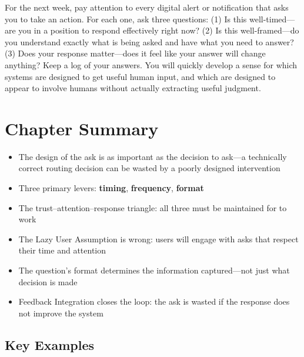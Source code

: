 \begin{trythis}
For the next week, pay attention to every digital alert or notification that asks you to take an action. For each one, ask three questions: (1) Is this well-timed---are you in a position to respond effectively right now? (2) Is this well-framed---do you understand exactly what is being asked and have what you need to answer? (3) Does your response matter---does it feel like your answer will change anything? Keep a log of your answers. You will quickly develop a sense for which systems are designed to get useful human input, and which are designed to appear to involve humans without actually extracting useful judgment.
\end{trythis}

\section*{Chapter Summary}

\begin{keyconcept}
\begin{itemize}
  \item The design of the ask is as important as the decision to ask---a technically correct routing decision can be wasted by a poorly designed intervention
  \item Three primary levers: \textbf{timing}, \textbf{frequency}, \textbf{format}
  \item The trust--attention--response triangle: all three must be maintained for \hitl to work
  \item The Lazy User Assumption is wrong: users will engage with asks that respect their time and attention
  \item The question's format determines the information captured---not just what decision is made
  \item Feedback Integration closes the loop: the ask is wasted if the response does not improve the system
\end{itemize}
\end{keyconcept}

\subsection*{Key Examples}

